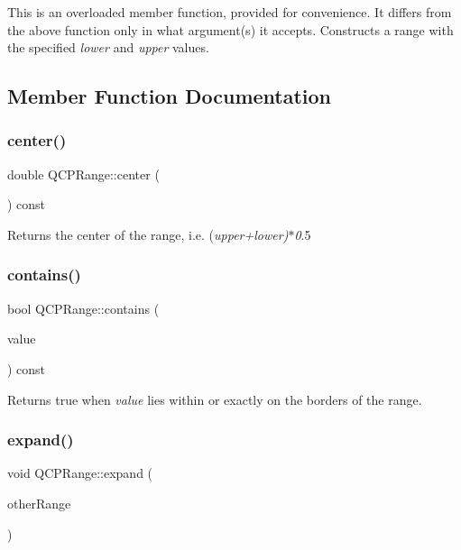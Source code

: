 This is an overloaded member function, provided for convenience. It differs from the above function only in what argument(s) it accepts. Constructs a range with the specified {\itshape lower} and {\itshape upper} values. 

\subsection{Member Function Documentation}
\mbox{\label{class_q_c_p_range_af57d4a37a45d0101177ca30fae5d4ca8}} 
\subsubsection{\texorpdfstring{center()}{center()}}
{\footnotesize\ttfamily double Q\+C\+P\+Range\+::center (\begin{DoxyParamCaption}{ }\end{DoxyParamCaption}) const}

Returns the center of the range, i.\+e. ({\itshape upper+{\itshape lower})$\ast$0}.5 \mbox{\label{class_q_c_p_range_ae9842b48b6d38dc5e9607358e3083cc8}} 
\subsubsection{\texorpdfstring{contains()}{contains()}}
{\footnotesize\ttfamily bool Q\+C\+P\+Range\+::contains (\begin{DoxyParamCaption}\item[{double}]{value }\end{DoxyParamCaption}) const}

Returns true when {\itshape value} lies within or exactly on the borders of the range. \mbox{\label{class_q_c_p_range_a0fa1bc8048be50d52bea93a8caf08305}} 
\subsubsection{\texorpdfstring{expand()}{expand()}}
{\footnotesize\ttfamily void Q\+C\+P\+Range\+::expand (\begin{DoxyParamCaption}\item[{const \mbox{\hyperlink{class_q_c_p_range}{Q\+C\+P\+Range}} \&}]{other\+Range }\end{DoxyParamCaption})}

